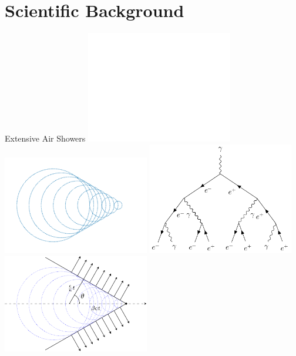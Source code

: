 \section{Scientific Background}%
\label{sec:introduction}

\begin{frame}{Extensive Air Showers}
    {%
    \includegraphics[width=0.48\textwidth]{graphics/heitler_model_dark.pdf}
    \includegraphics[width=0.48\textwidth]{graphics/cherenkov_radiation_dark.pdf}
    }
    {%
    \includegraphics[width=0.48\textwidth]{graphics/heitler_model.pdf}
    \includegraphics[width=0.48\textwidth]{graphics/cherenkov_radiation.pdf}
    }
\end{frame}